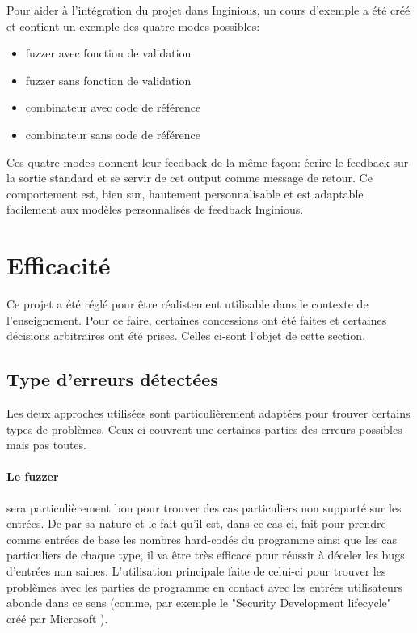 \documentclass[a4paper]{report}
\begin{document}
Pour aider à l'intégration du projet dans Inginious, un cours d'exemple a été créé et contient un exemple des quatre modes possibles:
\begin{itemize}
\item fuzzer avec fonction de validation
\item fuzzer sans fonction de validation
\item combinateur avec code de référence
\item combinateur sans code de référence
\end{itemize}
Ces quatre modes donnent leur feedback de la même façon: écrire le feedback sur la sortie standard et se servir de cet output comme message de retour.
Ce comportement est, bien sur, hautement personnalisable et est adaptable facilement aux modèles personnalisés de feedback Inginious.

\section{Efficacité}

Ce projet a été réglé pour être réalistement utilisable dans le contexte de l'enseignement.
Pour ce faire, certaines concessions  ont été faites et certaines décisions arbitraires ont été prises.
Celles ci-sont l'objet de cette section.

\subsection{Type d'erreurs détectées}


Les deux approches utilisées sont particulièrement adaptées pour trouver certains types de problèmes.
Ceux-ci couvrent une certaines parties des erreurs possibles mais pas toutes.

\paragraph{Le fuzzer} sera particulièrement bon pour trouver des cas particuliers non supporté sur les entrées.
De par sa nature et le fait qu'il est, dans ce cas-ci, fait pour prendre comme entrées de base les nombres hard-codés du programme ainsi que les cas particuliers de chaque type, il va être très efficace pour réussir à déceler les bugs d'entrées non saines.
L'utilisation principale faite de celui-ci pour trouver les problèmes avec les parties de programme en contact avec les entrées utilisateurs abonde dans ce sens (comme, par exemple le "Security Development lifecycle" créé par Microsoft \cite{howard2006security}).
\end{document}

